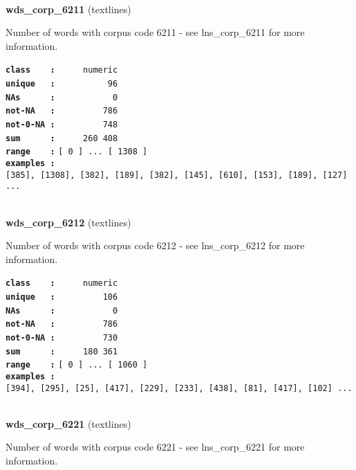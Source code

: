 \documentclass[]{article}
\begin{document}
~

\textbf{wds\_corp\_6211} (textlines)

Number of words with corpus code 6211 - see lns\_corp\_6211 for more
information.

\textbf{\texttt{class\ \ \ \ :}} \texttt{~~~~~numeric}\\
\textbf{\texttt{unique\ \ \ :}} \texttt{~~~~~~~~~~96}\\
\textbf{\texttt{NAs\ \ \ \ \ \ :}} \texttt{~~~~~~~~~~~0}\\
\textbf{\texttt{not-NA\ \ \ :}} \texttt{~~~~~~~~~786}\\
\textbf{\texttt{not-0-NA\ :}} \texttt{~~~~~~~~~748}\\
\textbf{\texttt{sum\ \ \ \ \ \ :}} \texttt{~~~~~260~408}\\
\textbf{\texttt{range\ \ \ \ :}}
\texttt{{[}\ 0\ {]}\ ...\ {[}\ 1308\ {]}}\\
\textbf{\texttt{examples\ :}}
\texttt{{[}385{]},\ {[}1308{]},\ {[}382{]},\ {[}189{]},\ {[}382{]},\ {[}145{]},\ {[}610{]},\ {[}153{]},\ {[}189{]},\ {[}127{]}\ ...}\\

~

\textbf{wds\_corp\_6212} (textlines)

Number of words with corpus code 6212 - see lns\_corp\_6212 for more
information.

\textbf{\texttt{class\ \ \ \ :}} \texttt{~~~~~numeric}\\
\textbf{\texttt{unique\ \ \ :}} \texttt{~~~~~~~~~106}\\
\textbf{\texttt{NAs\ \ \ \ \ \ :}} \texttt{~~~~~~~~~~~0}\\
\textbf{\texttt{not-NA\ \ \ :}} \texttt{~~~~~~~~~786}\\
\textbf{\texttt{not-0-NA\ :}} \texttt{~~~~~~~~~730}\\
\textbf{\texttt{sum\ \ \ \ \ \ :}} \texttt{~~~~~180~361}\\
\textbf{\texttt{range\ \ \ \ :}}
\texttt{{[}\ 0\ {]}\ ...\ {[}\ 1060\ {]}}\\
\textbf{\texttt{examples\ :}}
\texttt{{[}394{]},\ {[}295{]},\ {[}25{]},\ {[}417{]},\ {[}229{]},\ {[}233{]},\ {[}438{]},\ {[}81{]},\ {[}417{]},\ {[}102{]}\ ...}\\

~

\textbf{wds\_corp\_6221} (textlines)

Number of words with corpus code 6221 - see lns\_corp\_6221 for more
information.
\end{document}
